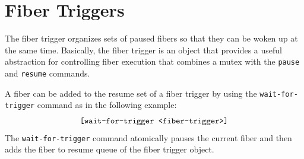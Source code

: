 \section{Fiber Triggers}

The fiber trigger organizes sets of paused fibers so that they can be
woken up at the same time.  Basically, the fiber trigger is an object
that provides a useful abstraction for controlling fiber execution
that combines a mutex with the {\tt pause} and {\tt resume} commands.

A fiber can be added to the resume set of a fiber trigger by using the
{\tt wait-for-trigger} command as in the following example:
\begin{equation*}
\text{\tt [wait-for-trigger <fiber-trigger>]}
\end{equation*}
The {\tt wait-for-trigger} command atomically pauses the current fiber
and then adds the fiber to resume queue of the fiber trigger object.

